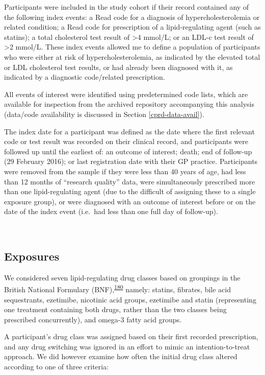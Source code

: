 \documentclass[a4paper, twoside]{templates/ociamthesis}
\begin{document}
Participants were included in the study cohort if their record contained any of the following index events: a Read code for a diagnosis of hypercholesterolemia or related condition; a Read code for prescription of a lipid-regulating agent (such as statins); a total cholesterol test result of \textgreater4 mmol/L; or an LDL-c test result of \textgreater2 mmol/L. These index events allowed me to define a population of participants who were either at risk of hypercholesterolemia, as indicated by the elevated total or LDL cholesterol test results, or had already been diagnosed with it, as indicated by a diagnostic code/related prescription.

All events of interest were identified using predetermined code lists, which are available for inspection from the archived repository accompanying this analysis (data/code availability is discussed in Section \ref{cprd-data-avail}).

The index date for a participant was defined as the date where the first relevant code or test result was recorded on their clinical record, and participants were followed up until the earliest of: an outcome of interest; death; end of follow-up (29 February 2016); or last registration date with their GP practice. Participants were removed from the sample if they were less than 40 years of age, had less than 12 months of ``research quality'' data, were simultaneously prescribed more than one lipid-regulating agent (due to the difficult of assigning these to a single exposure group), or were diagnosed with an outcome of interest before or on the date of the index event (i.e.~had less than one full day of follow-up).

~

\hypertarget{exposures}{%
\subsection{Exposures}\label{exposures}}

We considered seven lipid-regulating drug classes based on groupings in the British National Formulary (BNF),\textsuperscript{\protect\hyperlink{ref-wishart2017}{180}} namely: statins, fibrates, bile acid sequestrants, ezetimibe, nicotinic acid groups, ezetimibe and statin (representing one treatment containing both drugs, rather than the two classes being prescribed concurrently), and omega-3 fatty acid groups.

A participant's drug class was assigned based on their first recorded prescription, and any drug switching was ignored in an effort to mimic an intention-to-treat approach. We did however examine how often the initial drug class altered according to one of three criteria:
\end{document}

